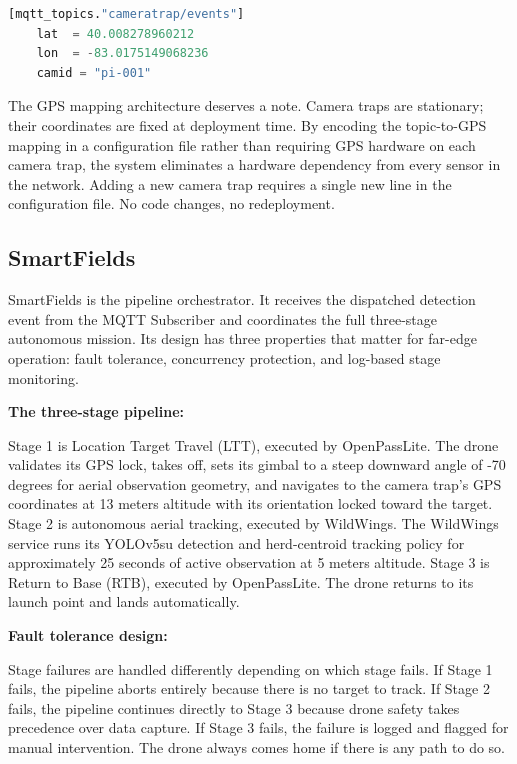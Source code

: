 \begin{center}
    \begin{lstlisting}[language=python]
    [mqtt_topics."cameratrap/events"]
    lat  = 40.008278960212
    lon  = -83.0175149068236
    camid = "pi-001"
    \end{lstlisting}
\end{center}

The GPS mapping architecture deserves a note. Camera traps are stationary; their coordinates are fixed at deployment time. By encoding the topic-to-GPS mapping in a configuration file rather than requiring GPS hardware on each camera trap, the system eliminates a hardware dependency from every sensor in the network. Adding a new camera trap requires a single new line in the configuration file. No code changes, no redeployment.

\subsection{SmartFields}
\label{subsec:ch4_rtb}
SmartFields is the pipeline orchestrator. It receives the dispatched detection event from the MQTT Subscriber and coordinates the full three-stage autonomous mission. Its design has three properties that matter for far-edge operation: fault tolerance, concurrency protection, and log-based stage monitoring.

\textbf{The three-stage pipeline:}

Stage 1 is Location Target Travel (LTT), executed by OpenPassLite. The drone validates its GPS lock, takes off, sets its gimbal to a steep downward angle of -70 degrees for aerial observation geometry, and navigates to the camera trap's GPS coordinates at 13 meters altitude with its orientation locked toward the target. Stage 2 is autonomous aerial tracking, executed by WildWings. The WildWings service runs its YOLOv5su detection and herd-centroid tracking policy for approximately 25 seconds of active observation at 5 meters altitude. Stage 3 is Return to Base (RTB), executed by OpenPassLite. The drone returns to its launch point and lands automatically.

\textbf{Fault tolerance design:}

Stage failures are handled differently depending on which stage fails. If Stage 1 fails, the pipeline aborts entirely because there is no target to track. If Stage 2 fails, the pipeline continues directly to Stage 3 because drone safety takes precedence over data capture. If Stage 3 fails, the failure is logged and flagged for manual intervention. The drone always comes home if there is any path to do so.

